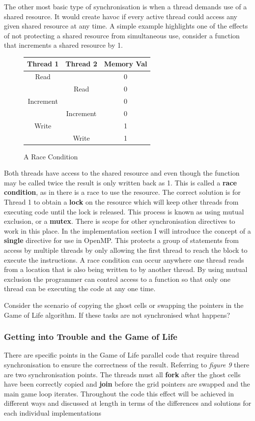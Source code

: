 \documentclass[11pt]{article} %
\begin{document}
The other most basic type of synchronisation is when a thread demands use of a shared resource. It would create havoc if every active thread could access any given shared resource at any time. A simple example highlights one of the effects of not protecting a shared resource from simultaneous use, consider a function that increments a shared resource by 1.
\begin{figure}[h]
\caption{A Race Condition}
\centering
\begin{tabular}{|c|c|c|}
\hline Thread 1 & Thread 2 & Memory Val \\ 
\hline
\hline Read &  & 0 \\ 
\hline  & Read & 0 \\ 
\hline Increment &  & 0 \\ 
\hline  & Increment & 0 \\ 
\hline Write &  & 1 \\ 
\hline  & Write & 1 \\ 
\hline 
\end{tabular} 
\end{figure}
Both threads have access to the shared resource and even though the function may be called twice the result is only written back as 1. This is called a {\bf race condition}, as in there is a race to use the resource. The correct solution is for Thread 1 to obtain a {\bf lock} on the resource which will keep other threads from executing code until the lock is released. This process is known as using mutual exclusion, or a {\bf mutex}.\cite[p272]{ref14} There is scope for other synchronisation directives to work in this place. In the implementation section I will introduce the concept of a {\bf single} directive for use in OpenMP. This protects a group of statements from access by multiple threads by only allowing the first thread to reach the block to execute the instructions.
A race condition can occur anywhere one thread reads from a location that is also being written to by another thread. By using mutual exclusion the programmer can control access to a function so that only one thread can be executing the code at any one time. \cite[p18]{ref14}

Consider the scenario of copying the ghost cells or swapping the pointers in the Game of Life algorithm. If these tasks are not synchronised what happens?
\subsubsection{Getting into Trouble and the Game of Life}
There are specific points in the Game of Life parallel code that require thread synchronisation to ensure the correctness of the result. Referring to {\it figure 9} there are two synchronisation points. The threads must all {\bf fork} after the ghost cells have been correctly copied and {\bf join} before the grid pointers are swapped and the main game loop iterates. Throughout the code this effect will be achieved in different ways and discussed at length in terms of the differences and solutions for each individual implementations
\end{document}

